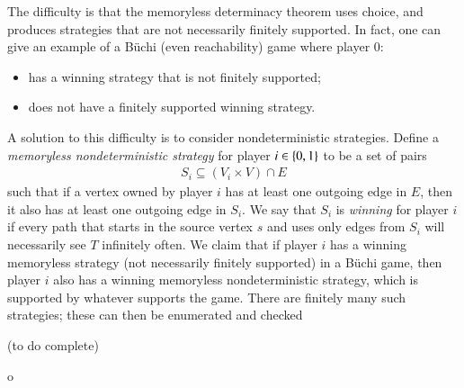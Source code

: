  { The difficulty is that the memoryless determinacy theorem uses choice, and produces strategies that are not necessarily finitely supported. In fact, one can give an example of a B\"uchi (even reachability) game where player $0$:
\begin{itemize}
	\item has a winning strategy that is not finitely supported;
	\item does not have a finitely supported winning strategy.
\end{itemize}
 A solution to this difficulty is to consider nondeterministic strategies. 
Define a \emph{memoryless nondeterministic strategy} for player $i \in \{0,1\}$ to be a set of pairs 
\begin{align*}
	S_i \subseteq (V_i \times V) \cap E
\end{align*}
such that if a vertex owned by player $i$ has at least one outgoing edge in $E$, then it also has at least one outgoing edge in $S_i$. 
We say that $S_i$ is \emph{winning} for player $i$ if every path that starts in the source vertex $s$ and uses only edges from $S_i$ will necessarily see $T$ infinitely often. We claim that if player $i$ has a winning memoryless strategy (not necessarily finitely supported) in a B\"uchi game, then player $i$ also has a winning memoryless nondeterministic strategy, which is supported by whatever supports the game. There are finitely many such strategies; these can then be enumerated and checked 

(to do complete)

o}



